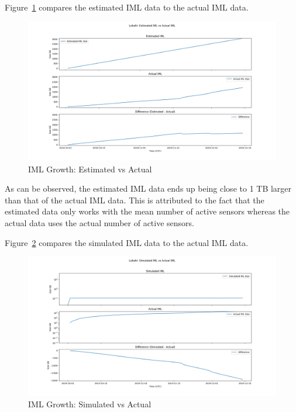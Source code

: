 Figure~\ref{fig:lokahi_actual_iml_vs_est} compares the estimated IML data to the actual IML data.

\begin{figure}[H]
    \centering
    \includegraphics[width=\linewidth]{figures/lokahi_actual_iml_vs_est.png}
    \caption{IML Growth: Estimated vs Actual}
    \label{fig:lokahi_actual_iml_vs_est}
\end{figure}

As can be observed, the estimated IML data ends up being close to 1 TB larger than that of the actual IML data. This is attributed to the fact that the estimated data only works with the mean number of active sensors whereas the actual data uses the actual number of active sensors.

Figure~\ref{fig:lokahi_actual_iml_vs_sim} compares the simulated IML data to the actual IML data.

\begin{figure}[H]
    \centering
    \includegraphics[width=\linewidth]{figures/lokahi_actual_iml_vs_sim.png}
    \caption{IML Growth: Simulated vs Actual}
    \label{fig:lokahi_actual_iml_vs_sim}
\end{figure}

